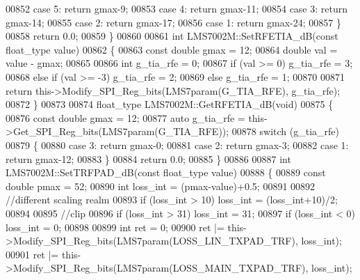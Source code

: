 \begin{DoxyCode}
{{{{{{{{{{{{{{{{{{{{{{{{{00852     \textcolor{keywordflow}{case} 5: \textcolor{keywordflow}{return} gmax-9;
00853     \textcolor{keywordflow}{case} 4: \textcolor{keywordflow}{return} gmax-11;
00854     \textcolor{keywordflow}{case} 3: \textcolor{keywordflow}{return} gmax-14;
00855     \textcolor{keywordflow}{case} 2: \textcolor{keywordflow}{return} gmax-17;
00856     \textcolor{keywordflow}{case} 1: \textcolor{keywordflow}{return} gmax-24;
00857     \}
00858     \textcolor{keywordflow}{return} 0.0;
00859 \}
00860 
00861 \textcolor{keywordtype}{int} LMS7002M::SetRFETIA_dB(\textcolor{keyword}{const} float_type value)
00862 \{
00863     \textcolor{keyword}{const} \textcolor{keywordtype}{double} gmax = 12;
00864     \textcolor{keywordtype}{double} val = value - gmax;
00865 
00866     \textcolor{keywordtype}{int} g\_tia\_rfe = 0;
00867     \textcolor{keywordflow}{if} (val >= 0) g\_tia\_rfe = 3;
00868     \textcolor{keywordflow}{else} \textcolor{keywordflow}{if} (val >= -3) g\_tia\_rfe = 2;
00869     \textcolor{keywordflow}{else} g\_tia\_rfe = 1;
00870 
00871     \textcolor{keywordflow}{return} this->Modify_SPI_Reg_bits(LMS7param(G_TIA_RFE), g\_tia\_rfe);
00872 \}
00873 
00874 float_type LMS7002M::GetRFETIA_dB(\textcolor{keywordtype}{void})
00875 \{
00876     \textcolor{keyword}{const} \textcolor{keywordtype}{double} gmax = 12;
00877     \textcolor{keyword}{auto} g\_tia\_rfe = this->Get_SPI_Reg_bits(LMS7param(G_TIA_RFE));
00878     \textcolor{keywordflow}{switch} (g\_tia\_rfe)
00879     \{
00880     \textcolor{keywordflow}{case} 3: \textcolor{keywordflow}{return} gmax-0;
00881     \textcolor{keywordflow}{case} 2: \textcolor{keywordflow}{return} gmax-3;
00882     \textcolor{keywordflow}{case} 1: \textcolor{keywordflow}{return} gmax-12;
00883     \}
00884     \textcolor{keywordflow}{return} 0.0;
00885 \}
00886 
00887 \textcolor{keywordtype}{int} LMS7002M::SetTRFPAD_dB(\textcolor{keyword}{const} float_type value)
00888 \{
00889     \textcolor{keyword}{const} \textcolor{keywordtype}{double} pmax = 52;
00890     \textcolor{keywordtype}{int} loss\_int = (pmax-value)+0.5;
00891 
00892     \textcolor{comment}{//different scaling realm}
00893     \textcolor{keywordflow}{if} (loss\_int > 10) loss\_int = (loss\_int+10)/2;
00894 
00895     \textcolor{comment}{//clip}
00896     \textcolor{keywordflow}{if} (loss\_int > 31) loss\_int = 31;
00897     \textcolor{keywordflow}{if} (loss\_int < 0) loss\_int = 0;
00898 
00899     \textcolor{keywordtype}{int} ret = 0;
00900     ret |= this->Modify_SPI_Reg_bits(LMS7param(LOSS_LIN_TXPAD_TRF), loss\_int);
00901     ret |= this->Modify_SPI_Reg_bits(LMS7param(LOSS_MAIN_TXPAD_TRF), loss\_int);
}}}}}}}}}}}}}}}}}}}}}}}}}
\end{DoxyCode}
